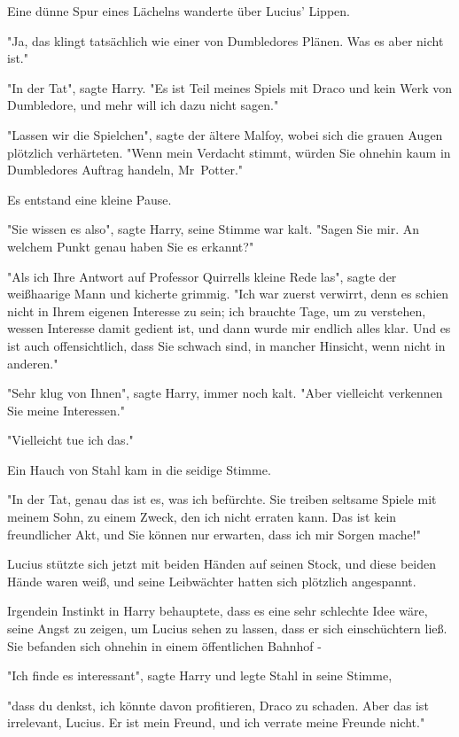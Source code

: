 {Eine dünne Spur eines Lächelns wanderte über Lucius' Lippen.

"Ja, das klingt tatsächlich wie einer von Dumbledores Plänen. Was es aber nicht ist."

"In der Tat", sagte Harry. "Es ist Teil meines Spiels mit Draco und kein Werk von Dumbledore, und mehr will ich dazu nicht sagen."

"Lassen wir die Spielchen", sagte der ältere Malfoy, wobei sich die grauen Augen plötzlich verhärteten. "Wenn mein Verdacht stimmt, würden Sie ohnehin kaum in Dumbledores Auftrag handeln, Mr~Potter."

Es entstand eine kleine Pause.

"Sie wissen es also", sagte Harry, seine Stimme war kalt. "Sagen Sie mir. An welchem Punkt genau haben Sie es erkannt?"

"Als ich Ihre Antwort auf Professor Quirrells kleine Rede las", sagte der weißhaarige Mann und kicherte grimmig. "Ich war zuerst verwirrt, denn es schien nicht in Ihrem eigenen Interesse zu sein; ich brauchte Tage, um zu verstehen, wessen Interesse damit gedient ist, und dann wurde mir endlich alles klar. Und es ist auch offensichtlich, dass Sie schwach sind, in mancher Hinsicht, wenn nicht in anderen."

"Sehr klug von Ihnen", sagte Harry, immer noch kalt. "Aber vielleicht verkennen Sie meine Interessen."

"Vielleicht tue ich das."

Ein Hauch von Stahl kam in die seidige Stimme.

"In der Tat, genau das ist es, was ich befürchte. Sie treiben seltsame Spiele mit meinem Sohn, zu einem Zweck, den ich nicht erraten kann. Das ist kein freundlicher Akt, und Sie können nur erwarten, dass ich mir Sorgen mache!"

Lucius stützte sich jetzt mit beiden Händen auf seinen Stock, und diese beiden Hände waren weiß, und seine Leibwächter hatten sich plötzlich angespannt.

Irgendein Instinkt in Harry behauptete, dass es eine sehr schlechte Idee wäre, seine Angst zu zeigen, um Lucius sehen zu lassen, dass er sich einschüchtern ließ. Sie befanden sich ohnehin in einem öffentlichen Bahnhof -

"Ich finde es interessant", sagte Harry und legte Stahl in seine Stimme,

"dass du denkst, ich könnte davon profitieren, Draco zu schaden. Aber das ist irrelevant, Lucius. Er ist mein Freund, und ich verrate meine Freunde nicht."

}
